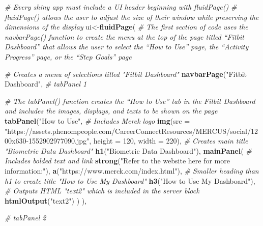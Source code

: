 \documentclass[]{book}
\newenvironment{Shaded}{\begin{snugshade}}{\end{snugshade}}
\newcommand{\CommentTok}[1]{\textcolor[rgb]{0.56,0.35,0.01}{\textit{#1}}}
\newcommand{\DataTypeTok}[1]{\textcolor[rgb]{0.13,0.29,0.53}{#1}}
\newcommand{\DecValTok}[1]{\textcolor[rgb]{0.00,0.00,0.81}{#1}}
\newcommand{\KeywordTok}[1]{\textcolor[rgb]{0.13,0.29,0.53}{\textbf{#1}}}
\newcommand{\NormalTok}[1]{#1}
\newcommand{\StringTok}[1]{\textcolor[rgb]{0.31,0.60,0.02}{#1}}
\begin{document}
\begin{Shaded}
\begin{Highlighting}[]
{{\CommentTok{# Every shiny app must include a UI header beginning with fluidPage()}
\CommentTok{# fluidPage() allows the user to adjust the size of their window while preserving the dimensions of the display}
\NormalTok{ui<-}\KeywordTok{fluidPage}\NormalTok{(}
  \CommentTok{# The first section of code uses the navbarPage() function to create the menu at the top of the page titled “Fitbit Dashboard” that allows the user to select the “How to Use” page, the “Activity Progress” page, or the “Step Goals” page}
  
  \CommentTok{# Creates a menu of selections titled "Fitbit Dashboard"}
  \KeywordTok{navbarPage}\NormalTok{(}\StringTok{"Fitbit Dashboard"}\NormalTok{,          }
             \CommentTok{# tabPanel 1}
             
             \CommentTok{# The tabPanel() function creates the “How to Use” tab in the Fitbit Dashboard and includes the images, displays, and texts to be shown on the page}
             \KeywordTok{tabPanel}\NormalTok{(}\StringTok{"How to Use"}\NormalTok{,}
                      \CommentTok{# Includes Merck logo}
                      \KeywordTok{img}\NormalTok{(}\DataTypeTok{src =} \StringTok{"https://assets.phenompeople.com/CareerConnectResources/MERCUS/social/1200x630-1552902977090.jpg"}\NormalTok{, }\DataTypeTok{height =} \DecValTok{120}\NormalTok{, }\DataTypeTok{width =} \DecValTok{220}\NormalTok{),}
                      \CommentTok{# Creates main title "Biometric Data Dashboard"}
                      \KeywordTok{h1}\NormalTok{(}\StringTok{"Biometric Data Dashboard"}\NormalTok{),}
                      \KeywordTok{mainPanel}\NormalTok{(}
                        \CommentTok{# Includes bolded text and link}
                        \KeywordTok{strong}\NormalTok{(}\StringTok{"Refer to the website here for more information:"}\NormalTok{),}
                        \KeywordTok{a}\NormalTok{(}\StringTok{"https://www.merck.com/index.html"}\NormalTok{),}
                        \CommentTok{# Smaller heading than h1 to create title "How to Use My Dashboard"}
                        \KeywordTok{h3}\NormalTok{(}\StringTok{"How to Use My Dashboard"}\NormalTok{),}
                        \CommentTok{# Outputs HTML "text2" which is included in the server block}
                        \KeywordTok{htmlOutput}\NormalTok{(}\StringTok{"text2"}\NormalTok{)}
\NormalTok{                      )                      }
\NormalTok{             ), }
             
             \CommentTok{# tabPanel 2}
             
}}
\end{Highlighting}
\end{Shaded}
\end{document}
